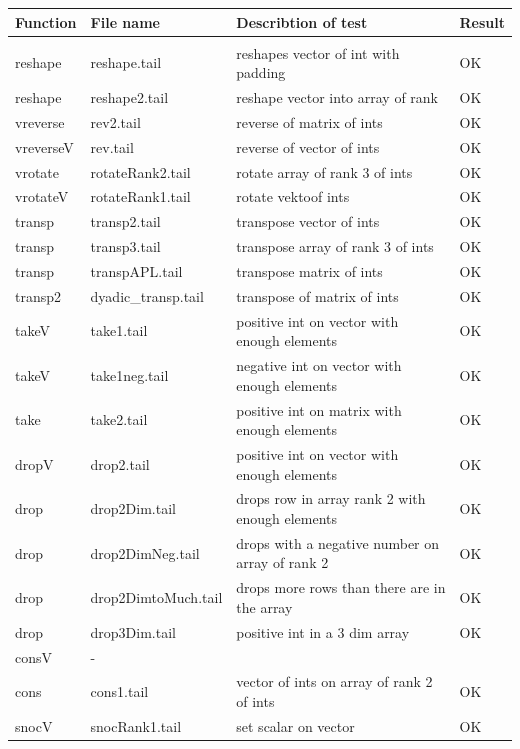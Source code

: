 \documentclass[11pt]{article}
\begin{document}
\begin{center}
\begin{tabular}{l l l l}
Function  		& File name		& Describtion of test						& Result \\ \hline \\
reshape		&  reshape.tail		& reshapes vector of int with padding			& OK \\
reshape 		& reshape2.tail	 	& reshape vector into array of rank 			& OK \\ 
vreverse		& rev2.tail			& reverse of matrix of ints					& OK \\
vreverseV		& rev.tail			& reverse of vector of ints					& OK \\
vrotate		& rotateRank2.tail	& rotate array of rank 3 of ints				& OK \\
vrotateV		& rotateRank1.tail	& rotate vektoof ints 						& OK \\
transp		& transp2.tail		& transpose vector of ints					& OK \\
transp 		& transp3.tail		& transpose array of rank 3 of ints			& OK \\ 
transp 		& transpAPL.tail		& transpose matrix of ints					& OK \\	
transp2		& dyadic\_transp.tail	& transpose of matrix of ints				& OK \\
takeV		& take1.tail		& positive int on vector with enough elements 	& OK \\ 
takeV		& take1neg.tail		& negative int on vector with enough elements	& OK \\ 
take			& take2.tail		& positive int on matrix with enough elements 	& OK \\
dropV		& drop2.tail		& positive int on vector with enough elements	& OK \\
drop			& drop2Dim.tail	    	& drops row in array rank 2 with enough elements & OK \\
drop 			& drop2DimNeg.tail 	& drops with a negative number on array of rank 2 & OK \\
drop 			& drop2DimtoMuch.tail & drops more rows than there are in the array     & OK \\
drop 			& drop3Dim.tail		& positive int in a 3 dim array				& OK \\ 
consV		& -				&									&  \\
cons			& cons1.tail		& vector of ints on array of rank 2 of ints		& OK \\ 
snocV		& snocRank1.tail 	& set scalar on vector						& OK \\

\end{tabular}
\end{center}
\end{document}
